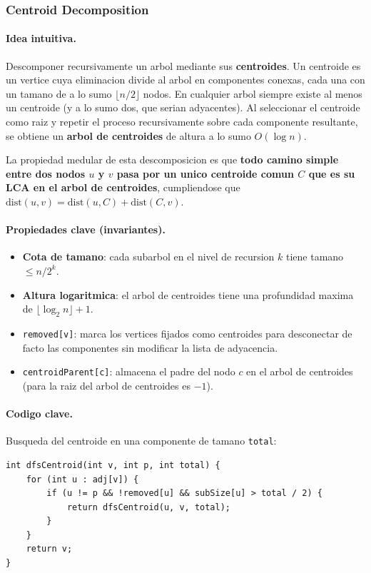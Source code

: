 \subsubsection{Centroid Decomposition}

\paragraph{Idea intuitiva.}
Descomponer recursivamente un arbol mediante sus \textbf{centroides}. Un centroide es un vertice cuya eliminacion divide al arbol en componentes conexas, cada una con un tamano de a lo sumo $\lfloor n/2 \rfloor$ nodos. En cualquier arbol siempre existe al menos un centroide (y a lo sumo dos, que serian adyacentes). Al seleccionar el centroide como raiz y repetir el proceso recursivamente sobre cada componente resultante, se obtiene un \textbf{arbol de centroides} de altura a lo sumo $O(\log n)$.

La propiedad medular de esta descomposicion es que \textbf{todo camino simple entre dos nodos $u$ y $v$ pasa por un unico centroide comun $C$ que es su LCA en el arbol de centroides}, cumpliendose que $\text{dist}(u, v) = \text{dist}(u, C) + \text{dist}(C, v)$.

\paragraph{Propiedades clave (invariantes).}
\begin{itemize}\setlength\itemsep{0pt}
	\item \textbf{Cota de tamano}: cada subarbol en el nivel de recursion $k$ tiene tamano $\le n / 2^k$.
	\item \textbf{Altura logaritmica}: el arbol de centroides tiene una profundidad maxima de $\lfloor \log_2 n \rfloor + 1$.
	\item \texttt{removed[v]}: marca los vertices fijados como centroides para desconectar de facto las componentes sin modificar la lista de adyacencia.
	\item \texttt{centroidParent[c]}: almacena el padre del nodo $c$ en el arbol de centroides (para la raiz del arbol de centroides es $-1$).
\end{itemize}

\paragraph{Codigo clave.}
Busqueda del centroide en una componente de tamano \texttt{total}:
\begin{verbatim}
int dfsCentroid(int v, int p, int total) {
    for (int u : adj[v]) {
        if (u != p && !removed[u] && subSize[u] > total / 2) {
            return dfsCentroid(u, v, total);
        }
    }
    return v;
}
\end{verbatim}

